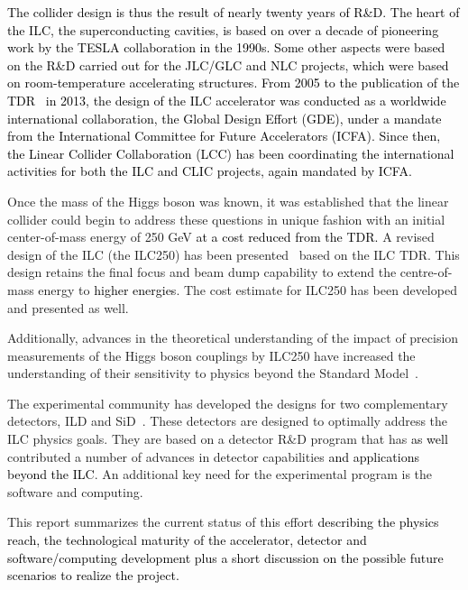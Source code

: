 \documentclass[%
 reprint,
 amsmath,amssymb,
 aps,
]{revtex4-1}
\newcommand{\juan}[1]{\textcolor{black}{{#1}}}
\newcommand{\jim}[1]{\textcolor{black}{#1}}
\begin{document}
\juan{ The collider design is thus the result of nearly twenty years of R\&D. The heart of the ILC, the superconducting cavities, is based on over a decade of pioneering work by the TESLA collaboration in the 1990s. Some other aspects were based on the R\&D carried out for the JLC/GLC and NLC projects, which were based on room-temperature accelerating structures. From 2005 to the publication of the TDR~\cite{Behnke:2013xla} in 2013, the design of the ILC accelerator was conducted as a worldwide international collaboration, the Global Design Effort (GDE), under a mandate from the International Committee for Future Accelerators (ICFA).
Since then, the Linear Collider Collaboration (LCC) has been coordinating the international activities for both the ILC and CLIC projects, again mandated by ICFA.}


Once the mass of the Higgs boson was known, it was established that the
linear collider could begin to address these questions in unique fashion
with an initial center-of-mass energy of 250 GeV \jim{at a cost reduced from the TDR.}
A revised design of the ILC (the ILC250) has been presented~\cite{Evans:2017rvt}
based on the ILC TDR.  This design retains the final focus and beam dump
capability to extend the centre-of-mass energy to \juan{higher energies}.  The cost estimate for ILC250 has 
been developed and presented as well.

Additionally, advances in the theoretical understanding of the impact of precision
measurements of the Higgs boson couplings by ILC250 have increased the understanding
of their sensitivity to physics beyond the Standard Model~\cite{Barklow:2017suo,Fujii:2017vwa}. 

The experimental community has developed the designs for two complementary detectors,
ILD and SiD~\cite{Behnke:2013lya}.  These detectors are designed to optimally address the
ILC physics goals.  They are based on a detector R\&D program that has \juan{as well}
contributed a number of advances in detector capabilities \juan{and applications beyond the ILC}.
An additional key need for the experimental program is the software and computing.

This report summarizes the current status of this effort \juan{describing the physics reach, the technological maturity of the accelerator, detector and software/computing development plus a short discussion on the possible future scenarios to realize the project.} 
\end{document}
